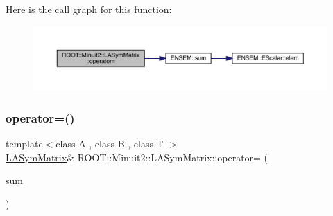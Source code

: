 Here is the call graph for this function\+:
\nopagebreak
\begin{figure}[H]
\begin{center}
\leavevmode
\includegraphics[width=350pt]{d3/d72/classROOT_1_1Minuit2_1_1LASymMatrix_a88d40828624a6418f8b94e239e30d322_cgraph}
\end{center}
\end{figure}
\mbox{\label{classROOT_1_1Minuit2_1_1LASymMatrix_a88d40828624a6418f8b94e239e30d322}} 
\subsubsection{\texorpdfstring{operator=()}{operator=()}\hspace{0.1cm}{\footnotesize\ttfamily [11/21]}}
{\footnotesize\ttfamily template$<$class A , class B , class T $>$ \\
\mbox{\hyperlink{classROOT_1_1Minuit2_1_1LASymMatrix}{L\+A\+Sym\+Matrix}}\& R\+O\+O\+T\+::\+Minuit2\+::\+L\+A\+Sym\+Matrix\+::operator= (\begin{DoxyParamCaption}\item[{const \mbox{\hyperlink{classROOT_1_1Minuit2_1_1ABObj}{A\+B\+Obj}}$<$ \mbox{\hyperlink{classROOT_1_1Minuit2_1_1sym}{sym}}, \mbox{\hyperlink{classROOT_1_1Minuit2_1_1ABSum}{A\+B\+Sum}}$<$ \mbox{\hyperlink{classROOT_1_1Minuit2_1_1ABObj}{A\+B\+Obj}}$<$ \mbox{\hyperlink{classROOT_1_1Minuit2_1_1sym}{sym}}, A, T $>$, \mbox{\hyperlink{classROOT_1_1Minuit2_1_1ABObj}{A\+B\+Obj}}$<$ \mbox{\hyperlink{classROOT_1_1Minuit2_1_1sym}{sym}}, B, T $>$ $>$, T $>$ \&}]{sum }\end{DoxyParamCaption})\hspace{0.3cm}{\ttfamily [inline]}}


